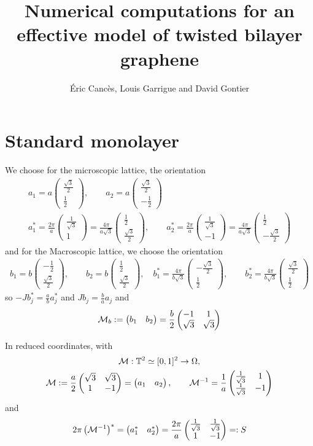 \documentclass[11pt,a4paper,reqno,french,tikz]{amsart}
\title[Numerics effective TBG]{Numerical computations for an effective model of twisted bilayer graphene}
\author[É. Cancès, L. Garrigue and D. Gontier]{Éric Cancès, Louis Garrigue and David Gontier}
\newcommand{\pa}[1]{\left( #1 \right)} %
\newcommand{\f}[2]{\frac{#1}{#2}} %
\newcommand{\mat}[1]{\begin{pmatrix} #1 \end{pmatrix}} %
\begin{document}
\maketitle

\section{Standard monolayer}%
\label{sec:standard_monolayer}

We choose for the microscopic lattice, the orientation
\begin{multline}\label{eq:lattice_a}
a_1 = a \mat{ \f{\sqrt 3}2 \\ \f 12}, \qquad a_2 = a \mat{ \f{\sqrt 3}2 \\ -\f 12} \\
a^*_1 = \f{2\pi}{a} \mat{ \f{1}{\sqrt 3} \\ 1}= \f{4\pi}{a\sqrt{3}} \mat{ \f{1}{2} \\ \f{\sqrt{3}}{2}}, \qquad a^*_2 = \f{2\pi}{a} \mat{ \f{1}{\sqrt 3} \\ -1}= \f{4\pi}{a\sqrt{3}} \mat{ \f{1}{2} \\ -\f{\sqrt{3}}{2}}
\end{multline}
and for the Macroscopic lattice, we choose the orientation
\begin{multline}\label{def:lattice_b}
b_1 = b \mat{ -\f 12 \\ \f{\sqrt 3}{2}  }, \qquad b_2 = b \mat{ \f 12 \\ \f{\sqrt 3}2}, \quad b^*_1 = \f{4\pi}{b\sqrt{3}} \mat{- \f{\sqrt{3}}{2}\\ \f{1}{2} }, \qquad b^*_2 = \f{4\pi}{b\sqrt{3}} \mat{\f{\sqrt{3}}{2} \\ \f{1}{2} }
\end{multline}
so $-J b_j^* = \f{a}{b} a_j^*$ and $J b_j = \f{b}{a} a_j$ and 
\begin{align*}
	\cM_b := \mat{b_1 & b_2} = \f{b}{2} \mat{-1 & 1 \\ \sqrt 3 & \sqrt 3}
\end{align*}

In reduced coordinates, with 
\begin{multline*}
	\cM : \mathbb{T}^2 \simeq [0,1]^2 \rightarrow \Omega, \\
	\cM :=  \f a2 \mat{\sqrt{3} & \sqrt{3} \\ 1 & -1} = \mat{a_1 & a_2}, \qquad  \cM^{-1} = \f 1a \mat{\f 1{\sqrt 3} & 1 \\ \f 1{\sqrt 3} & -1}
\end{multline*}
and
\begin{align*}
	2\pi \pa{\cM^{-1}}^* = \mat{a_1^* & a_2^*} = \f{2\pi}a \mat{\f{1}{\sqrt 3} & \f{1}{\sqrt 3} \\ 1 & -1} =: S
\end{align*}
\end{document}
